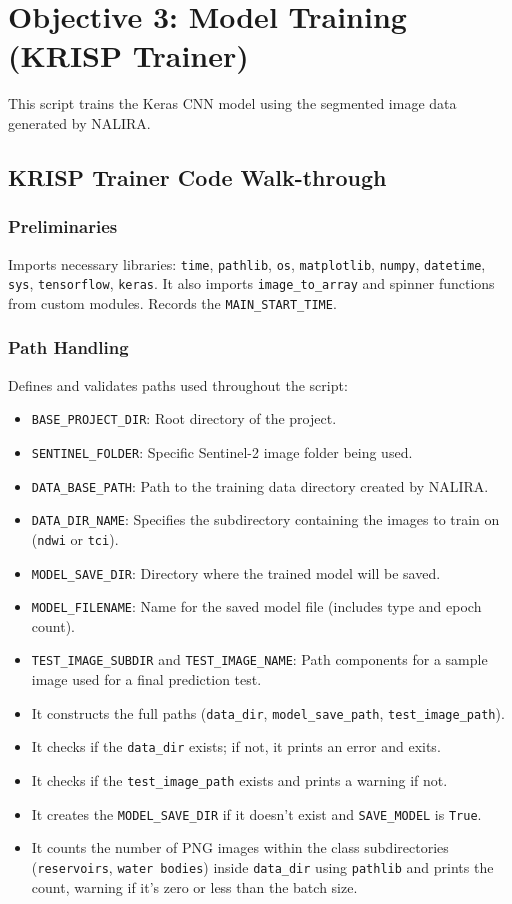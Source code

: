 \section{Objective 3: Model Training (KRISP Trainer)}
This script trains the Keras CNN model using the segmented image data generated by NALIRA.

\subsection{KRISP Trainer Code Walk-through}

\subsubsection{Preliminaries}
Imports necessary libraries: \verb|time|, \verb|pathlib|, \verb|os|, \verb|matplotlib|, \verb|numpy|, \verb|datetime|, \verb|sys|, \verb|tensorflow|, \verb|keras|. It also imports \verb|image_to_array| and spinner functions from custom modules. Records the \verb|MAIN_START_TIME|.

\subsubsection{Path Handling}
Defines and validates paths used throughout the script:
\begin{itemize}
    \item \verb|BASE_PROJECT_DIR|: Root directory of the project.
    \item \verb|SENTINEL_FOLDER|: Specific Sentinel-2 image folder being used.
    \item \verb|DATA_BASE_PATH|: Path to the training data directory created by NALIRA.
    \item \verb|DATA_DIR_NAME|: Specifies the subdirectory containing the images to train on (\texttt{ndwi} or \texttt{tci}).
    \item \verb|MODEL_SAVE_DIR|: Directory where the trained model will be saved.
    \item \verb|MODEL_FILENAME|: Name for the saved model file (includes type and epoch count).
    \item \verb|TEST_IMAGE_SUBDIR| and \verb|TEST_IMAGE_NAME|: Path components for a sample image used for a final prediction test.
    \item It constructs the full paths (\verb|data_dir|, \verb|model_save_path|, \verb|test_image_path|).
    \item It checks if the \verb|data_dir| exists; if not, it prints an error and exits.
    \item It checks if the \verb|test_image_path| exists and prints a warning if not.
    \item It creates the \verb|MODEL_SAVE_DIR| if it doesn't exist and \verb|SAVE_MODEL| is \verb|True|.
    \item It counts the number of PNG images within the class subdirectories (\verb|reservoirs|, \verb|water bodies|) inside \verb|data_dir| using \verb|pathlib| and prints the count, warning if it's zero or less than the batch size.
\end{itemize}


